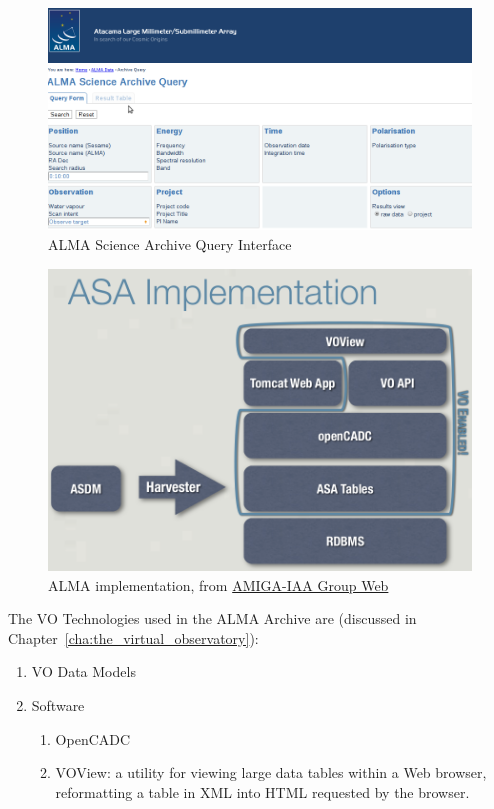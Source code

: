 \begin{figure}
\centering
\includegraphics[width=\textwidth]{images/aq.png}
\caption{ALMA Science Archive Query Interface}
\label{fig:asaqueryif}
\end{figure}

\label{fig:asa_implementation}
\begin{figure}
\centering
\includegraphics[height=8cm]{images/asa_implementation.png}
\caption{ALMA implementation, from  \href{http://amiga.iaa.es/FCKeditor/UserFiles/File/VOandALMAarchive_web.pdf}{AMIGA-IAA Group Web}}
\end{figure}


The VO Technologies used in the ALMA Archive are (discussed in Chapter~\ref{cha:the_virtual_observatory}):

\begin{enumerate}
\item VO Data Models
\item Software
  \begin{enumerate}
    \item OpenCADC
    \item VOView: a utility for viewing large data tables within a Web browser, reformatting a table in XML into HTML requested by the browser.
  \end{enumerate}
\end{enumerate}

